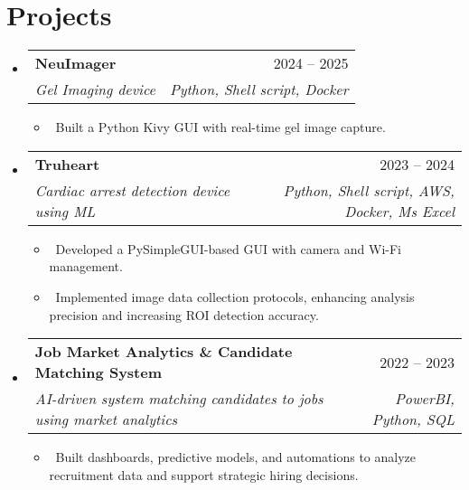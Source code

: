 \documentclass[letterpaper,10pt]{article}
\makeatletter
\newcommand{\resumeItem}[1]{\item\small{#1}}
\newcommand{\resumeSubheading}[4]{
\vspace{-1pt}\item
  \begin{tabular*}{0.97\textwidth}[t]{l@{\extracolsep{\fill}}r}
    \textbf{#1} & #2 \\
    \textit{#3} & \textit{#4} \\
  \end{tabular*}\vspace{-7pt}
}
\newcommand{\resumeSubHeadingList}{\begin{itemize}[leftmargin=0.15in, label={}]}
\newcommand{\resumeSubHeadingListEnd}{\end{itemize}}
\makeatother
\begin{document}
\section{Projects}
\resumeSubHeadingList
\resumeSubheading
{NeuImager }{2024 -- 2025}
{Gel Imaging device}{Python, Shell script, Docker}
\resumeSubHeadingList
\resumeItem{\textbullet\ Built a Python Kivy GUI with real-time gel image capture.}
\resumeSubHeadingListEnd

\resumeSubheading
{Truheart}{2023 --  2024}
{Cardiac arrest detection device using ML}{Python, Shell script, AWS, Docker, Ms Excel}
\resumeSubHeadingList
\resumeItem{\textbullet\ Developed a PySimpleGUI-based GUI with camera and Wi-Fi management.}
\resumeItem{\textbullet\ Implemented image data collection protocols, enhancing analysis precision and increasing ROI detection accuracy.}
\resumeSubHeadingListEnd

\resumeSubheading
{Job Market Analytics \& Candidate Matching System }{2022 --  2023}
{AI-driven system matching candidates to jobs using market analytics}{PowerBI, Python, SQL}
\resumeSubHeadingList
\resumeItem{\textbullet\ Built dashboards, predictive models, and automations to analyze recruitment data and support strategic hiring decisions.}
\resumeSubHeadingListEnd
\resumeSubHeadingListEnd

\end{document}
